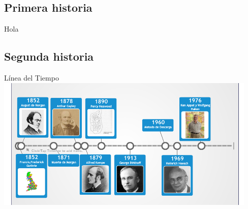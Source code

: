 \documentclass[spanish,utf8]{beamer}
\begin{document}
\subsection{Primera historia}

\begin{frame}[t]
Hola
\end{frame}


\subsection{Segunda historia}

\begin{frame}{\insertsection}\transblindsvertical
Línea del Tiempo
\centering
\includegraphics[width=12.5cm]{linea.png}    
\end{frame}
\end{document}
